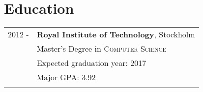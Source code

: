 \documentclass[a4paper,10pt]{article} %
\begin{document}
\pagestyle{fancy} %



\par{\bigskip\par} %




\section{Education}

\begin{tabular}{rl}	
\textsc{2012 - } & \textbf{Royal Institute of Technology}, Stockholm\\
& Master's Degree in \textsc{Computer Science}\\
& Expected graduation year: 2017\\
& Major GPA\footnotemark[1]: 3.92\\
&\\
\end{tabular}

\end{document}
